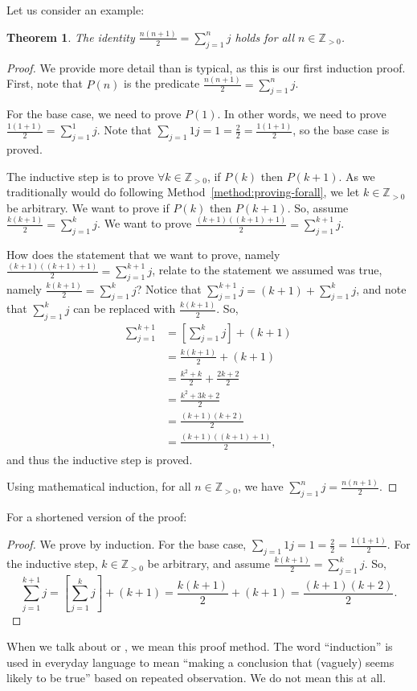 \documentclass{book}
\newcounter{ekcounter}%
\theoremstyle{ekimcustom}
\newtheorem{theorem}[ekcounter]{Theorem}
\newcommand\defn[1]{{\color{blue}{\bf #1}}}
\begin{document}
Let us consider an example:
\begin{theorem}
The identity $\displaystyle\frac{n(n+1)}{2}= \sum_{j=1}^n j$ holds for all $n \in \mathbb{Z}_{>0}$.
\end{theorem}
\begin{proof}
We provide more detail than is typical, as this is our first induction proof. First, note that $P(n)$ is the predicate $\displaystyle\frac{n(n+1)}{2}= \sum_{j=1}^n j$.

For the base case, we need to prove $P(1)$. In other words, we need to prove $\displaystyle\frac{1(1+1)}{2}= \sum_{j=1}^1 j$. Note that $\sum_{j=1}1 j = 1 = \frac22 = \frac{1(1+1)}{2}$, so the base case is proved.

The inductive step is to prove $\forall k \in \mathbb{Z}_{>0}$, if $P(k)$ then $P(k+1)$. As we traditionally would do following Method~\ref{method:proving-forall}, we let $k \in \mathbb{Z}_{>0}$ be arbitrary. We want to prove if $P(k)$ then $P(k+1)$. So, assume $\displaystyle\frac{k(k+1)}{2}= \sum_{j=1}^k j$. We want to prove $\displaystyle\frac{(k+1)((k+1)+1)}{2}= \sum_{j=1}^{k+1} j$.

How does the statement that we want to prove, namely $\displaystyle\frac{(k+1)((k+1)+1)}{2}= \sum_{j=1}^{k+1} j$, relate to the statement we assumed was true, namely $\displaystyle\frac{k(k+1)}{2}= \sum_{j=1}^k j$? Notice that $\displaystyle \sum_{j=1}^{k+1} j = (k+1)+\sum_{j=1}^{k} j$, and note that $\sum_{j=1}^{k} j$ can be replaced with $\frac{k(k+1)}{2}$. So,
\begin{align*}
\sum_{j=1}^{k+1} 
&= \left[ \sum_{j=1}^k j \right] + (k+1)\\
&= \frac{k(k+1)}{2} + (k+1)\\
&= \frac{k^2+k}{2} + \frac{2k+2}{2}\\
&= \frac{k^2+3k+2}{2}\\
&= \frac{(k+1)(k+2)}{2}\\
&= \frac{(k+1)((k+1)+1)}{2},
\end{align*}
and thus the inductive step is proved.

Using mathematical induction, for all $n \in \mathbb{Z}_{>0}$, we have $\sum_{j=1}^n j = \frac{n(n+1)}{2}$.
\end{proof}
For a shortened version of the proof:
\begin{proof}
We prove by induction. For the base case, $\sum_{j=1}1 j = 1 = \frac22 = \frac{1(1+1)}{2}$. For the inductive step, $k \in \mathbb{Z}_{>0}$ be arbitrary, and assume $\displaystyle\frac{k(k+1)}{2}= \sum_{j=1}^k j$. So,
\[
\sum_{j=1}^{k+1} j
= \left[ \sum_{j=1}^k j \right] + (k+1)
= \frac{k(k+1)}{2} + (k+1)
= \frac{(k+1)(k+2)}{2}.
\]
\end{proof}
When we talk about \defn{mathematical induction} or \defn{induction}, we mean this proof method. The word ``induction'' is used in everyday language to mean ``making a conclusion that (vaguely) seems likely to be true'' based on repeated observation. We do not mean this at all.
\end{document}
